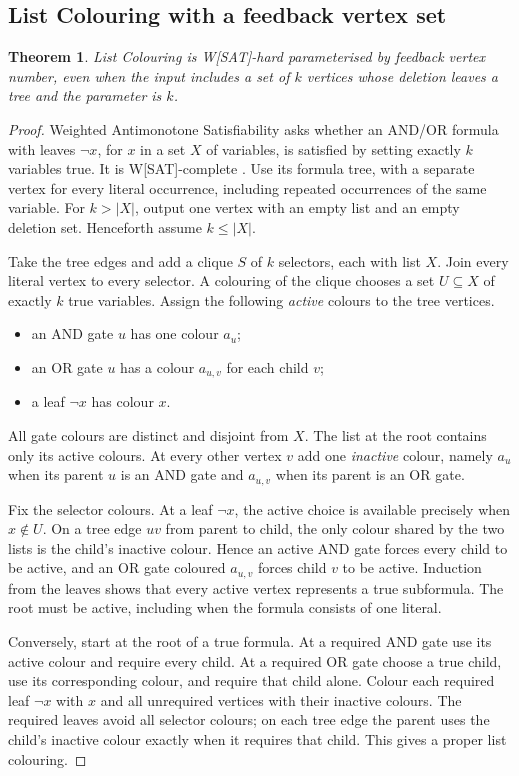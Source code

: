 \documentclass[11pt]{article}
\newtheorem{theorem}{Theorem}
\theoremstyle{remark}
\begin{document}
\subsection{List Colouring with a feedback vertex set}
\begin{theorem}\label{thm:list-feedback}
List Colouring is W[SAT]-hard parameterised by feedback vertex number,
even when the input includes a set of $k$ vertices whose deletion leaves a tree
and the parameter is $k$.
\end{theorem}
\begin{proof}
Weighted Antimonotone Satisfiability asks whether an AND/OR formula
with leaves $\neg x$, for $x$ in a set $X$ of variables, is satisfied by
setting exactly $k$ variables true. It is W[SAT]-complete
\cite[Theorem~4.1(ii)]{adf1995}. Use its formula tree, with a separate
vertex for every literal occurrence, including repeated occurrences of the
same variable. For $k>|X|$, output one vertex with an empty list and
an empty deletion set. Henceforth assume $k\leq |X|$.

Take the tree edges and add a clique $S$ of $k$ selectors, each with list
$X$. Join every literal vertex to every selector. A colouring of the clique
chooses a set $U\subseteq X$ of exactly $k$ true variables. Assign the
following \emph{active} colours to the tree vertices.
\begin{itemize}
\item an AND gate $u$ has one colour $a_u$;
\item an OR gate $u$ has a colour $a_{u,v}$ for each child $v$;
\item a leaf $\neg x$ has colour $x$.
\end{itemize}
All gate colours are distinct and disjoint from $X$. The list at the root
contains only its active colours. At every other vertex $v$ add one
\emph{inactive} colour, namely $a_u$ when its parent $u$ is an AND gate
and $a_{u,v}$ when its parent is an OR gate.

Fix the selector colours. At a leaf $\neg x$, the active choice is
available precisely when $x\notin U$. On a tree edge $uv$ from parent to
child, the only colour shared by the two lists is the child's inactive
colour. Hence an active AND gate forces every child to be active, and an
OR gate coloured $a_{u,v}$ forces child $v$ to be active. Induction from
the leaves shows that every active vertex represents a true subformula.
The root must be active, including when the formula consists of one literal.

Conversely, start at the root of a true formula. At a required AND gate
use its active colour and require every child. At a required OR gate choose
a true child, use its corresponding colour, and require that child alone.
Colour each required leaf $\neg x$ with $x$ and all unrequired vertices
with their inactive colours. The required leaves avoid all selector colours;
on each tree edge the parent uses the child's inactive colour exactly when
it requires that child. This gives a proper list colouring.


\end{proof}
\end{document}
